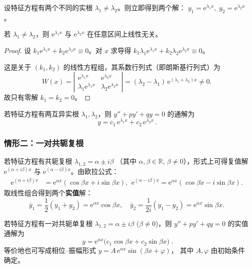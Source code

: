 \documentclass[lang=cn,11pt]{elegantbook}
\begin{document}
设特征方程有两个不同的实根 $\lambda_1\neq\lambda_2$。则立即得到两个解：
$y_1=\mathrm{e}^{\lambda_1x},\; y_2=\mathrm{e}^{\lambda_2x}$。

\begin{theorem}[线性无关性验证]
若 $\lambda_1 \neq \lambda_2$，则 $\mathrm{e}^{\lambda_1x}$ 与 $\mathrm{e}^{\lambda_2x}$ 在任意区间上线性无关。
\end{theorem}

\begin{proof}
设 $k_1\mathrm{e}^{\lambda_1x}+k_2\mathrm{e}^{\lambda_2x}\equiv 0$。对 $x$ 求导得
$k_1\lambda_1\mathrm{e}^{\lambda_1x}+k_2\lambda_2\mathrm{e}^{\lambda_2x}\equiv 0$。

这是关于 $(k_1,k_2)$ 的线性方程组，其系数行列式（即朗斯基行列式）为
\[
W(x)=\left|\begin{matrix}\mathrm{e}^{\lambda_1x}&\mathrm{e}^{\lambda_2x}\\[2pt]\lambda_1\mathrm{e}^{\lambda_1x}&\lambda_2\mathrm{e}^{\lambda_2x}\end{matrix}\right|
=(\lambda_2-\lambda_1)\,\mathrm{e}^{(\lambda_1+\lambda_2)x} \neq 0.
\]
故只有零解 $k_1=k_2=0$。
\end{proof}

\begin{property}[互异实根情形的通解] \label{prop:char-distinct-real}
若特征方程有两互异实根 $\lambda_1,\lambda_2$，则 $y''+py'+qy=0$ 的通解为
\[
\boxed{\,y=c_1\,\mathrm{e}^{\lambda_1x}+c_2\,\mathrm{e}^{\lambda_2x}\,}.
\]
\end{property}


\subsubsection*{情形二：一对共轭复根}

若特征方程有共轭复根 $\lambda_{1,2}=\alpha\pm i\beta$
（其中 $\alpha,\beta\in\mathbb R$, $\beta \neq 0$），形式上可得复值解
$\mathrm{e}^{(\alpha+i\beta)x}$ 与 $\mathrm{e}^{(\alpha-i\beta)x}$。由欧拉公式：
\begin{align*}
\mathrm{e}^{(\alpha+i\beta)x}&=\mathrm{e}^{\alpha x}(\cos\beta x+i\sin\beta x),~~\mathrm{e}^{(\alpha-i\beta)x}=\mathrm{e}^{\alpha x}(\cos\beta x-i\sin\beta x).
\end{align*}
取线性组合得到两个\textbf{实值}解：
\[
\bar y_1=\frac12(y_1+y_2)=\mathrm{e}^{\alpha x}\cos\beta x,\quad
\bar y_2=\frac{1}{2i}(y_1-y_2)=\mathrm{e}^{\alpha x}\sin\beta x.
\]

\begin{property}[共轭复根情形的通解] \label{prop:char-complex}
若特征方程有一对共轭单复根 $\lambda_{1,2}=\alpha\pm i\beta$ ($\beta \neq 0$)，则 $y''+py'+qy=0$ 的实值通解为
\[
\boxed{\;y=\mathrm{e}^{\alpha x}\bigl(c_1\cos\beta x+c_2\sin\beta x\bigr)\;} .
\]
等价地也可写成相位–振幅形式
$y=A\,\mathrm{e}^{\alpha x}\sin(\beta x+\varphi)$，
其中 $A,\varphi$ 由初始条件确定。
\end{property}
\end{document}
